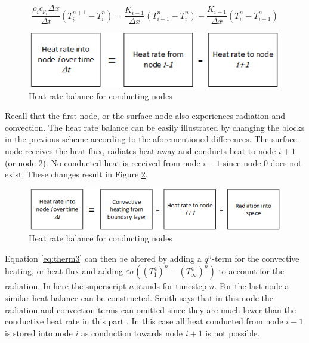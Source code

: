 \begin{equation}
\frac{\rho_ic_{p_i}\Delta x}{\Delta t}\left(T_i^{n+1}-T_i^n\right)=\frac{K_{i-1}}{\Delta x}\left(T_{i-1}^n-T_i^n\right)-\frac{K_{i+1}}{\Delta x}\left(T_i^n-T_{i+1}^n\right)
\label{eq:therm3}
\end{equation}

\begin{figure}[H]
	\centering
	\includegraphics{Figure/thermblocknode1.png}
	\caption{Heat rate balance for conducting nodes}
	\label{fig:thermbalance1}
\end{figure}

Recall that the first node, or the surface node also experiences radiation and convection. The heat rate balance can be easily illustrated by changing the blocks in the previous scheme according to the aforementioned differences. The surface node receives the heat flux, radiates heat away and conducts heat to node $i+1$ (or node 2). No conducted heat is received from node $i-1$ since node 0 does not exist. These changes result in Figure \ref{fig:thermbalance2}.

\begin{figure}[H]
	\centering
	\includegraphics{Figure/thermblocknode2.png}
	\caption{Heat rate balance for conducting nodes}
	\label{fig:thermbalance2}
\end{figure}

Equation \eqref{eq:therm3} can then be altered by adding a $q^n$-term for the convective heating, or heat flux and adding  $\varepsilon\sigma\left(\left(T_1^4\right)^n-\left(T_\infty^4\right)^n\right)$ to account for the radiation. In here the superscript $n$ stands for timestep $n$. For the last node a similar heat balance can be constructed. Smith says that in this node the radiation and convection terms can omitted since they are much lower than the conductive heat rate in this part \cite{Smith2011}. In this case all heat conducted from node $i-1$ is stored into node $i$ as conduction towards node $i+1$ is not possible.

